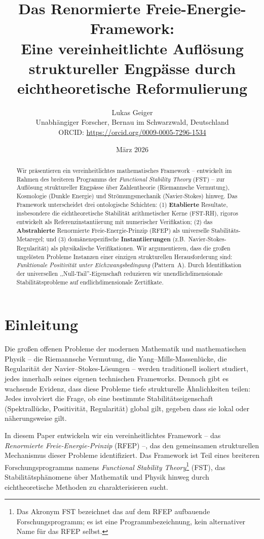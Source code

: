 \documentclass[12pt,a4paper]{article}
\title{%
  Das Renormierte Freie-Energie-Framework:\\
  Eine vereinheitlichte Auflösung struktureller Engpässe durch eichtheoretische Reformulierung
}
\author{%
  Lukas Geiger\\
  \small Unabhängiger Forscher, Bernau im Schwarzwald, Deutschland\\
  \small ORCID: \url{https://orcid.org/0009-0005-7296-1534}
}
\date{März 2026}
\theoremstyle{definition}
\theoremstyle{remark}
\begin{document}
\maketitle

\begin{abstract}
Wir präsentieren ein vereinheitlichtes mathematisches Framework -- entwickelt im Rahmen des breiteren Programms der \emph{Functional Stability Theory} (FST) -- zur Auflösung struktureller Engpässe über Zahlentheorie (Riemannsche Vermutung), Kosmologie (Dunkle Energie) und Strömungsmechanik (Navier-Stokes) hinweg. Das Framework unterscheidet drei ontologische Schichten: (1) \textbf{Etablierte} Resultate, insbesondere die eichtheoretische Stabilität arithmetischer Kerne (FST-RH), rigoros entwickelt als Referenzinstantiierung mit numerischer Verifikation; (2) das \textbf{Abstrahierte} Renormierte Freie-Energie-Prinzip (RFEP) als universelle Stabilitäts-Metaregel; und (3) domänenspezifische \textbf{Instantiierungen} (z.B.\ Navier-Stokes-Regularität) als physikalische Verifikationen. Wir argumentieren, dass die großen ungelösten Probleme Instanzen einer einzigen strukturellen Herausforderung sind: \emph{Funktionale Positivität unter Eichzwangsbedingung} (Pattern~A). Durch Identifikation der universellen ,,Null-Tail''-Eigenschaft reduzieren wir unendlichdimensionale Stabilitätsprobleme auf endlichdimensionale Zertifikate.
\end{abstract}

\tableofcontents

\section{Einleitung}

Die großen offenen Probleme der modernen Mathematik und mathematischen Physik -- die Riemannsche Vermutung, die Yang--Mills-Massenlücke, die Regularität der Navier--Stokes-Lösungen -- werden traditionell isoliert studiert, jedes innerhalb seines eigenen technischen Frameworks. Dennoch gibt es wachsende Evidenz, dass diese Probleme tiefe strukturelle Ähnlichkeiten teilen: Jedes involviert die Frage, ob eine bestimmte Stabilitätseigenschaft (Spektrallücke, Positivität, Regularität) global gilt, gegeben dass sie lokal oder näherungsweise gilt.

In diesem Paper entwickeln wir ein vereinheitlichtes Framework -- das \emph{Renormierte Freie-Energie-Prinzip} (RFEP) --, das den gemeinsamen strukturellen Mechanismus dieser Probleme identifiziert. Das Framework ist Teil eines breiteren Forschungsprogramms namens \emph{Functional Stability Theory}\footnote{Das Akronym FST bezeichnet das auf dem RFEP aufbauende Forschungsprogramm; es ist eine Programmbezeichnung, kein alternativer Name für das RFEP selbst.} (FST), das Stabilitätsphänomene über Mathematik und Physik hinweg durch eichtheoretische Methoden zu charakterisieren sucht.
\end{document}
